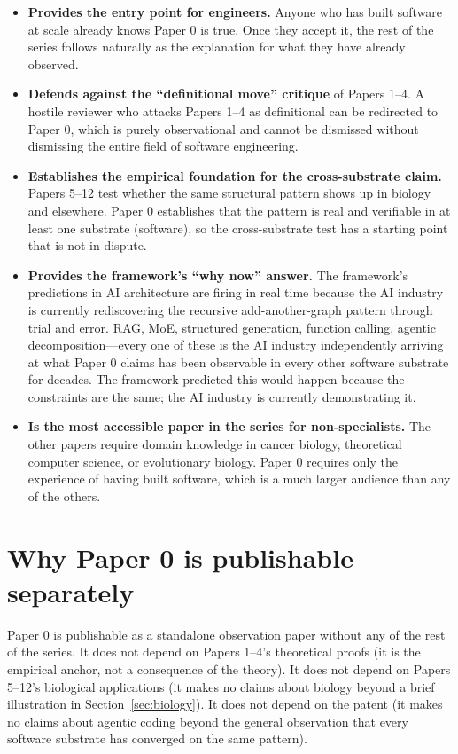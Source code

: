 \documentclass[11pt]{article}
\begin{document}
\begin{itemize}[leftmargin=*]
\item \textbf{Provides the entry point for engineers.} Anyone who has built software at scale already knows Paper 0 is true. Once they accept it, the rest of the series follows naturally as the explanation for what they have already observed.
\item \textbf{Defends against the ``definitional move'' critique} of Papers 1--4. A hostile reviewer who attacks Papers 1--4 as definitional can be redirected to Paper 0, which is purely observational and cannot be dismissed without dismissing the entire field of software engineering.
\item \textbf{Establishes the empirical foundation for the cross-substrate claim.} Papers 5--12 test whether the same structural pattern shows up in biology and elsewhere. Paper 0 establishes that the pattern is real and verifiable in at least one substrate (software), so the cross-substrate test has a starting point that is not in dispute.
\item \textbf{Provides the framework's ``why now'' answer.} The framework's predictions in AI architecture are firing in real time because the AI industry is currently rediscovering the recursive add-another-graph pattern through trial and error. RAG, MoE, structured generation, function calling, agentic decomposition---every one of these is the AI industry independently arriving at what Paper 0 claims has been observable in every other software substrate for decades. The framework predicted this would happen because the constraints are the same; the AI industry is currently demonstrating it.
\item \textbf{Is the most accessible paper in the series for non-specialists.} The other papers require domain knowledge in cancer biology, theoretical computer science, or evolutionary biology. Paper 0 requires only the experience of having built software, which is a much larger audience than any of the others.
\end{itemize}

\section{Why Paper 0 is publishable separately}
\label{sec:standalone}

Paper 0 is publishable as a standalone observation paper without any of the rest of the series. It does not depend on Papers 1--4's theoretical proofs (it is the empirical anchor, not a consequence of the theory). It does not depend on Papers 5--12's biological applications (it makes no claims about biology beyond a brief illustration in Section~\ref{sec:biology}). It does not depend on the patent (it makes no claims about agentic coding beyond the general observation that every software substrate has converged on the same pattern).
\end{document}
